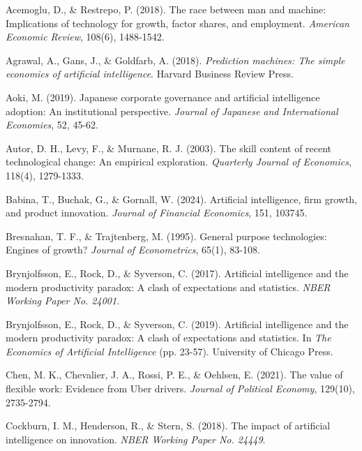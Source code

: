 \documentclass[12pt]{article}
\begin{document}

\begin{thebibliography}{99}

Acemoglu, D., \& Restrepo, P. (2018). The race between man and machine: Implications of technology for growth, factor shares, and employment. \textit{American Economic Review}, 108(6), 1488-1542.

Agrawal, A., Gans, J., \& Goldfarb, A. (2018). \textit{Prediction machines: The simple economics of artificial intelligence}. Harvard Business Review Press.

Aoki, M. (2019). Japanese corporate governance and artificial intelligence adoption: An institutional perspective. \textit{Journal of Japanese and International Economies}, 52, 45-62.

Autor, D. H., Levy, F., \& Murnane, R. J. (2003). The skill content of recent technological change: An empirical exploration. \textit{Quarterly Journal of Economics}, 118(4), 1279-1333.

Babina, T., Buchak, G., \& Gornall, W. (2024). Artificial intelligence, firm growth, and product innovation. \textit{Journal of Financial Economics}, 151, 103745.

Bresnahan, T. F., \& Trajtenberg, M. (1995). General purpose technologies: Engines of growth? \textit{Journal of Econometrics}, 65(1), 83-108.

Brynjolfsson, E., Rock, D., \& Syverson, C. (2017). Artificial intelligence and the modern productivity paradox: A clash of expectations and statistics. \textit{NBER Working Paper No. 24001}.

Brynjolfsson, E., Rock, D., \& Syverson, C. (2019). Artificial intelligence and the modern productivity paradox: A clash of expectations and statistics. In \textit{The Economics of Artificial Intelligence} (pp. 23-57). University of Chicago Press.

Chen, M. K., Chevalier, J. A., Rossi, P. E., \& Oehlsen, E. (2021). The value of flexible work: Evidence from Uber drivers. \textit{Journal of Political Economy}, 129(10), 2735-2794.

Cockburn, I. M., Henderson, R., \& Stern, S. (2018). The impact of artificial intelligence on innovation. \textit{NBER Working Paper No. 24449}.


\end{thebibliography}
\end{document}
